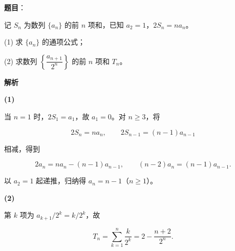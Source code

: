 \begin{answer}

\textbf{题目}：

记 $S_n$ 为数列 $\{a_n\}$ 的前 $n$ 项和，已知 $a_2=1$，$2S_n=na_n$。

  (1) 求 $\{a_n\}$ 的通项公式；

  (2) 求数列 $\left\{\dfrac{a_{n+1}}{2^n}\right\}$ 的前 $n$ 项和 $T_n$。

\textbf{解析}

\textbf{(1)}

当 $n=1$ 时，$2S_1=a_1$，故 $a_1=0$。对 $n\geqslant3$，将

\nopagebreak[4]
\[
2S_n=na_n,\qquad 2S_{n-1}=(n-1)a_{n-1}
\]

相减，得到

\nopagebreak[4]
\[
2a_n=na_n-(n-1)a_{n-1},
\qquad (n-2)a_n=(n-1)a_{n-1}.
\]

以 $a_2=1$ 起递推，归纳得 $a_n=n-1$（$n\geqslant1$）。

\textbf{(2)}

第 $k$ 项为 $a_{k+1}/2^k=k/2^k$，故

\nopagebreak[4]
\[
T_n=\sum_{k=1}^n\frac{k}{2^k}
=2-\frac{n+2}{2^n}.
\]



\end{answer}
